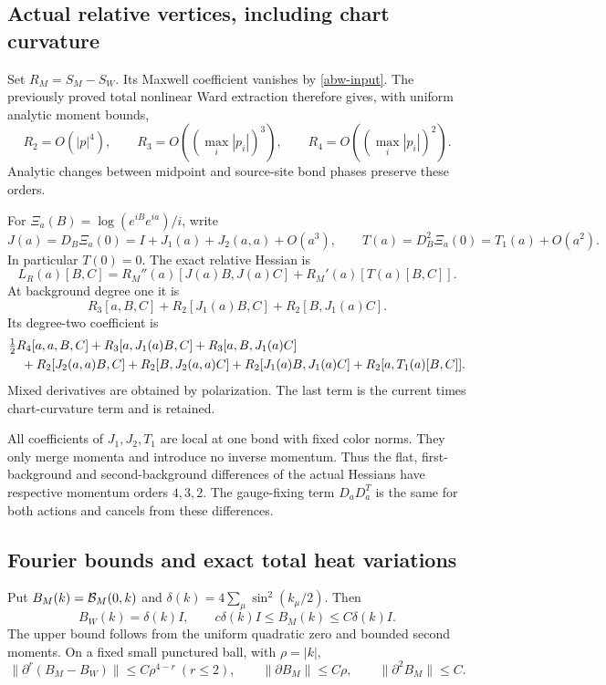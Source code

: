 \subsection{Actual relative vertices, including chart curvature}
\label{abw-chart-section}

Set \(R_M=S_M-S_W\). Its Maxwell coefficient vanishes by
\eqref{abw-input}. The previously proved total nonlinear Ward extraction
therefore gives, with uniform analytic moment bounds,
\begin{equation}
 R_2=O(|p|^4),\qquad R_3=O((\max_i|p_i|)^3),\qquad
 R_4=O((\max_i|p_i|)^2).
 \label{abw-ward-orders}
\end{equation}
Analytic changes between midpoint and source-site bond phases preserve
these orders.

For \(\Xi_a(B)=\log(e^{iB}e^{ia})/i\), write
\[
 J(a)=D_B\Xi_a(0)=I+J_1(a)+J_2(a,a)+O(a^3),\qquad
 T(a)=D_B^2\Xi_a(0)=T_1(a)+O(a^2).
\]
In particular \(T(0)=0\). The exact relative Hessian is
\begin{equation}
 L_R(a)[B,C]=R_M''(a)[J(a)B,J(a)C]
                  +R_M'(a)[T(a)[B,C]].
 \label{abw-chain}
\end{equation}
At background degree one it is
\[
 R_3[a,B,C]+R_2[J_1(a)B,C]+R_2[B,J_1(a)C].
\]
Its degree-two coefficient is
\begin{align}
 &\tfrac12R_4[a,a,B,C]
 +R_3[a,J_1(a)B,C]+R_3[a,B,J_1(a)C]\notag\\
 &\quad+R_2[J_2(a,a)B,C]+R_2[B,J_2(a,a)C]
 +R_2[J_1(a)B,J_1(a)C]+R_2[a,T_1(a)[B,C]].
 \label{abw-second-chart}
\end{align}
Mixed derivatives are obtained by polarization. The last term is the
current times chart-curvature term and is retained.

All coefficients of \(J_1,J_2,T_1\) are local at one bond with fixed color
norms. They only merge momenta and introduce no inverse momentum.
Thus the flat, first-background and second-background differences of the
actual Hessians have respective momentum orders \(4,3,2\).
The gauge-fixing term \(D_aD_a^T\) is the same for both actions and
cancels from these differences.

\subsection{Fourier bounds and exact total heat variations}
\label{abw-diagram-section}

Put \(B_M(k)={\cal B}_M(0,k)\) and
\(\delta(k)=4\sum_\mu\sin^2(k_\mu/2)\). Then
\begin{equation}
 B_W(k)=\delta(k)I,\qquad
 c\delta(k)I\le B_M(k)\le C\delta(k)I.
 \label{abw-ellipticity}
\end{equation}
The upper bound follows from the uniform quadratic zero and bounded
second moments. On a fixed small punctured ball, with \(\rho=|k|\),
\begin{equation}
 \|\partial^r(B_M-B_W)\|\le C\rho^{4-r}\ (r\le2),\qquad
 \|\partial B_M\|\le C\rho,\qquad \|\partial^2B_M\|\le C.
 \label{abw-flat-jets}
\end{equation}

